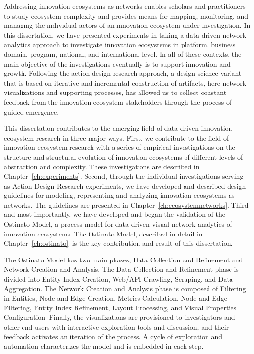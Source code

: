 Addressing innovation ecosystems as networks enables scholars and practitioners to study ecosystem complexity and provides means for mapping, monitoring, and managing the individual actors of an innovation ecosystem under investigation. In this dissertation, we have presented experiments in taking a data-driven network analytics approach to investigate innovation ecosystems in platform, business domain, program, national, and international level. In all of these contexts, the main objective of the investigations eventually is to support innovation and growth. Following the action design research approach, a design science variant that is based on iterative and incremental construction of artifacts, here network visualizations and supporting processes, has allowed us to collect constant feedback from the innovation ecosystem stakeholders through the process of guided emergence.

This dissertation contributes to the emerging field of data-driven innovation ecosystem research in three major ways. First, we contribute to the field of innovation ecosystem research with a series of empirical investigations on the structure and structural evolution of innovation ecosystems of different levels of abstraction and complexity. These investigations are described in Chapter~\ref{ch:experiments}. Second, through the individual investigations serving as Action Design Research experiments, we have developed and described design guidelines for modeling, representing and analyzing innovation ecosystems as networks. The guidelines are presented in Chapter~\ref{ch:ecosystemnetworks}. Third and most importantly, we have developed and began the validation of the Ostinato Model, a process model for data-driven visual network analytics of innovation ecosystems. The Ostinato Model, described in detail in Chapter~\ref{ch:ostinato}, is the key contribution and result of this dissertation.

The Ostinato Model has two main phases, Data Collection and Refinement and Network Creation and Analysis. The Data Collection and Refinement phase is divided into Entity Index Creation, Web/API Crawling, Scraping, and Data Aggregation. The Network Creation and Analysis phase is composed of Filtering in Entities, Node and Edge Creation, Metrics Calculation, Node and Edge Filtering, Entity Index Refinement, Layout Processing, and Visual Properties Configuration. Finally, the visualizations are provisioned to investigators and other end users with interactive exploration tools and discussion, and their feedback activates an iteration of the process. A cycle of exploration and automation characterizes the model and is embedded in each step.

